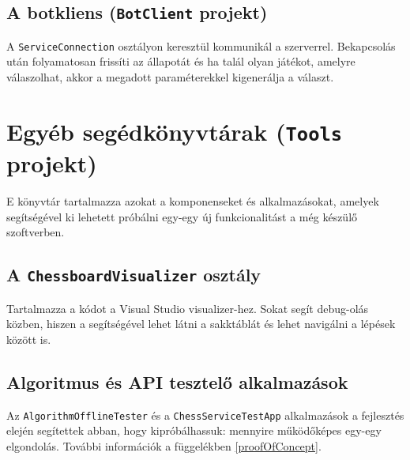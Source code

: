 \documentclass[twoside, a4paper, 12pt]{book}
\begin{document}
\subsection{A botkliens (\texttt{BotClient} projekt)}
A \texttt{ServiceConnection} osztályon keresztül kommunikál a szerverrel. Bekapcsolás után folyamatosan frissíti az állapotát és ha talál olyan játékot, amelyre válaszolhat, akkor a megadott paraméterekkel kigenerálja a választ.

\section{Egyéb segédkönyvtárak (\texttt{Tools} projekt)}
E könyvtár tartalmazza azokat a komponenseket és alkalmazásokat, amelyek segítségével ki lehetett próbálni egy-egy új funkcionalitást a még készülő szoftverben.

\subsection{A \texttt{ChessboardVisualizer} osztály}
Tartalmazza a kódot a Visual Studio visualizer-hez. Sokat segít debug-olás közben, hiszen a segítségével lehet látni a sakktáblát és lehet navigálni a lépések között is.

\subsection{Algoritmus és API tesztelő alkalmazások}
Az \texttt{AlgorithmOfflineTester} és a \texttt{ChessServiceTestApp} alkalmazások a fejlesztés elején segítettek abban, hogy kipróbálhassuk: mennyire működőképes egy-egy elgondolás. További információk a függelékben \ref{proofOfConcept}.

\newpage
\end{document}
